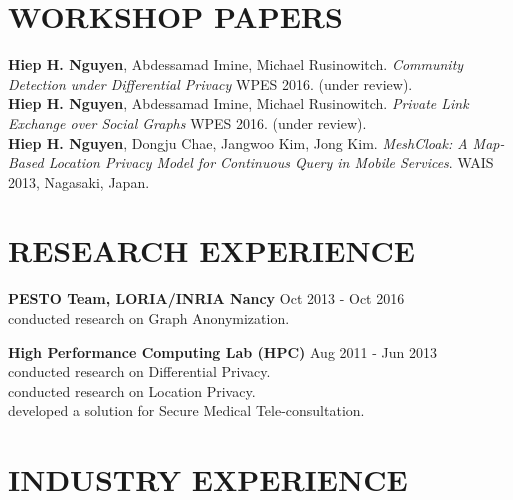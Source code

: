 \documentclass[margin, 10pt]{res} %
\begin{document}
\begin{resume}
\section{WORKSHOP PAPERS}
\textbf{Hiep H. Nguyen}, Abdessamad Imine, Michael Rusinowitch. \textit{Community Detection under Differential Privacy} WPES 2016. (under review). \\
\textbf{Hiep H. Nguyen}, Abdessamad Imine, Michael Rusinowitch. \textit{Private Link Exchange over Social Graphs} WPES 2016. (under review). \\
\textbf{Hiep H. Nguyen}, Dongju Chae, Jangwoo Kim, Jong Kim. \textit{MeshCloak: A Map-Based Location Privacy Model for Continuous Query in Mobile Services}. WAIS 2013, Nagasaki, Japan.



\section{RESEARCH EXPERIENCE}

\textbf{PESTO Team, LORIA/INRIA Nancy} \hfill Oct 2013 - Oct 2016 \\
conducted research on Graph Anonymization.	

\textbf{High Performance Computing Lab (HPC)}	\hfill Aug 2011 - Jun 2013 \\
conducted research on Differential Privacy.	\\
conducted research on Location Privacy. \\
developed a solution for Secure Medical Tele-consultation. 



\section{INDUSTRY EXPERIENCE}


\end{resume}
\end{document}
